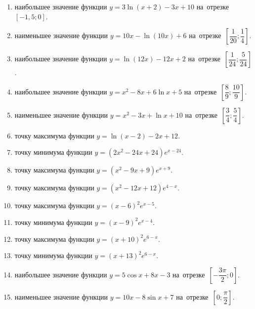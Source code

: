 \documentclass[a4paper,10pt]{article}
\begin{document}
\begin{enumerate}
\item {} наибольшее значение функции $y=3\ln \left(x+2\right)-3x+10$ на~отрезке~$\left[-1,5;0\right]$.

\item {} наименьшее значение функции $y=10x-\ln \left(10x\right)+6$ на~отрезке~$\left[\dfrac{1}{20};\dfrac{1}{4}\right]$.

\item {} наибольшее значение функции $y=\ln \left(12x\right)-12x+2$ на~отрезке~$\left[\dfrac{1}{24};\dfrac{5}{24}\right]$.

\item {} наибольшее значение функции $y=x^2-8x+6\ln x+5$ на~отрезке~$\left[\dfrac{8}{9};\dfrac{10}{9}\right]$.

\item {} наименьшее значение функции $y=x^2-3x+\ln x+10$ на~отрезке~$\left[\dfrac{3}{4};\dfrac{5}{4}\right]$.

\item {} точку максимума функции $y=\ln \left(x-2\right)-2x+12$.

\item {} точку минимума функции $y=\left(2x^2-24x+24\right)e^{x-24}$.

\item {} точку максимума функции $y=\left(x^2-9x+9\right)e^{x+9}$.

\item {} точку максимума функции $y=\left(x^2-12x+12\right)e^{4-x}$.

\item {} точку максимума функции $y=\left(x-6\right)^2e^{x-5}$.

\item {} точку минимума функции $y=\left(x-9\right)^2e^{x-4}$.

\item {} точку максимума функции $y=\left(x+10\right)^2e^{6-x}$.

\item {} точку минимума функции $y=\left(x+13\right)^2e^{6-x}$.

\item {} наибольшее значение функции $y=5\cos x+8x-3$ на~отрезке~$\left[-\dfrac{3\pi }{2};0\right]$.

\item {} наименьшее значение функции $y=10x-8\sin x+7$ на~отрезке~$\left[0;\dfrac{\pi }{2}\right]$.


\end{enumerate}
\end{document}
